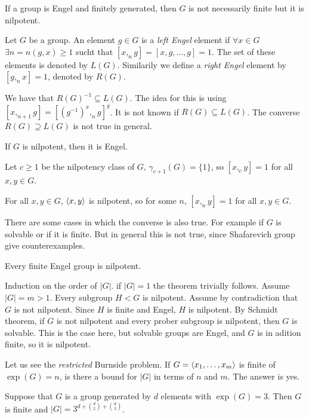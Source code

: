 \documentclass[twoside, 11pt]{article}
\begin{document}
If a group is Engel and finitely generated, then $G$ is not necessarily finite but it is nilpotent. 

\begin{defi}
Let $G$ be a group. An element $g\in G$ is a \emph{left Engel} element if $\forall x\in G$ $\exists n=n(g,x)\geq 1$ sucht that $[x,_n g]=[x,g,\dots, g]=1$. The set of these elements is denoted by $L(G)$. Similarily we define a \emph{right Engel} element by $[g,_n x]=1$, denoted by $R(G)$. 
\end{defi}

We have that $R(G)^{-1}\subseteq L(G)$. The idea for this is using $[x,_{n+1}g]=[(g^{-1})^x,_ng]^g$. It is not known if $R(G)\subseteq L(G)$. The converse $R(G)\supseteq L(G)$ is not true in general. 

\begin{prop}
If $G$ is nilpotent, then it is Engel.
\end{prop}
\begin{dem}
Let $c\geq 1$ be the nilpotency class of $G$, $\gamma_{c+1}(G)=\{1\}$, so $[x,_cy]=1$ for all $x,y\in G$.

For all  $x,y\in G$, $\langle{x,y}\rangle$ is nilpotent, so for some $n$, $[x,_ny]=1$ for all $x,y\in G$.
\end{dem}

There are some cases in which the converse is also true. For example if $G$ is solvable or if it is finite. But in general this is not true, since Shafarevich group give counterexamples. 

\begin{teorema}[Zorn]
Every finite Engel group is nilpotent.
\end{teorema}
\begin{dem}
Induction on the order of $|G|$. if $|G|=1$ the theorem trivially follows. Assume $|G|=m>1$. Every subgroup $H<G$ is nilpotent. Assume by contradiction that $G$ is not nilpotent. Since $H$ is finite and Engel, $H$ is nilpotent. By Schmidt theorem, if $G$ is not nilpotent and every prober subgroup is nilpotent, then $G$ is solvable. This is the case here, but solvable groups are Engel, and $G$ is in adition finite, so it is nilpotent.
\end{dem}

Let us see the \emph{restricted} Burnside problem. If $G=\langle{x_1,\dots, x_m}\rangle$ is finite of $\exp(G)=n$, is there a bound for $|G|$ in terms of $n$ and $m$. The answer is yes.

Suppose that $G$ is a group generated by $d$ elements with $\exp(G)=3$. Then $G$ is finite and $|G|=3^{d+\binom{d}{2}+\binom{d}{3}}$.
\end{document}
